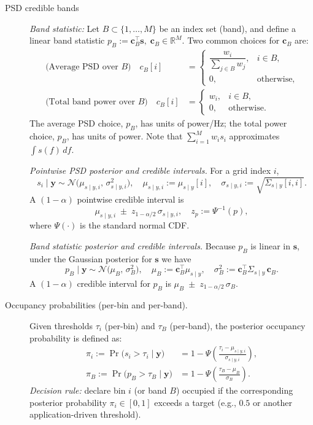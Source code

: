 \documentclass[11pt,a4paper]{report}
\theoremstyle{definition}
\providecommand{\ve}[1]{{\boldsymbol{#1}}}
\begin{document}
\begin{description}
\item[PSD credible bands]\;

\textit{Band statistic:} Let $B {\subset} \{1,\dots,M\}$ be an index set (band), and define a linear band statistic
\(p_B {:=} \ve{c}_B^\top \ve{s}, \; \ve{c}_B{ \in} \mathbb{R}^M.\) Two common choices for $\ve{c}_B$ are:
\begin{align*}
	\text{(Average PSD over $B$)}\quad
	c_B[i] &=
	\begin{cases}
		\dfrac{w_i}{\sum_{j \in B} w_j}, & i \in B,\\[6pt]
		0, & \text{otherwise,}
	\end{cases}
	\\[6pt]
	\text{(Total band power over $B$)}\quad
	c_B[i] &=
	\begin{cases}
		w_i, & i \in B,\\[4pt]
		0, & \text{otherwise.}
	\end{cases}
\end{align*}
The average PSD choice, $p_B$, has units of power/Hz; the total power choice, $p_B$, has units of power. Note that $\sum_{i=1}^M w_i s_i$ approximates $\int s(f)\,df$.

\textit{Pointwise PSD posterior and credible intervals.}
For a grid index $i$,
\[
s_i \mid \ve{y} \sim \mathcal{N}\!\big(\mu_{s\mid y,i},\, \sigma^2_{s\mid y,i}\big), 
\quad
\mu_{s\mid y,i} := \mu_{s\mid y}[i], 
\quad
\sigma_{s\mid y,i} := \sqrt{\varSigma_{s\mid y}[i,i]}.
\]
A $(1-\alpha)$ pointwise credible interval is
\[
\mu_{s\mid y,i} \;\pm\; z_{1-\alpha/2}\,\sigma_{s\mid y,i},
\quad
z_p := \Psi^{-1}(p),
\]
where $\Psi(\cdot)$ is the standard normal CDF.

\textit{Band statistic posterior and credible intervals.}
Because $p_B$ is linear in $\ve{s}$, under the Gaussian posterior for $\ve{s}$ we have
\[
p_B \mid \ve{y} \sim \mathcal{N}\!\big(\mu_B,\, \sigma_B^2\big),
\quad
\mu_B := \ve{c}_B^\top \mu_{s\mid y},
\quad
\sigma_B^2 := \ve{c}_B^\top \varSigma_{s\mid y}\, \ve{c}_B.
\]
A $(1-\alpha)$ credible interval for $p_B$ is
\(
\mu_B \;\pm\; z_{1-\alpha/2}\,\sigma_B.
\)

\item[{Occupancy probabilities (per-bin and per-band).}]
Given thresholds $\tau_i$ (per-bin) and $\tau_B$ (per-band), the posterior occupancy probability is defined as:
\begin{align*}
\pi_i :=	\Pr\!\big(s_i > \tau_i \mid \ve{y}\big) 
	&= 1 - \Psi\!\left(\frac{\tau_i - \mu_{s\mid y,i}}{\sigma_{s\mid y,i}}\right),\\[4pt]
\pi_B :=	\Pr\!\big(p_B > \tau_B \mid \ve{y}\big) 
	&= 1 - \Psi\!\left(\frac{\tau_B - \mu_B}{\sigma_B}\right).
\end{align*}
\textit{Decision rule:} declare bin $i$ (or band $B$) occupied if the corresponding posterior probability \(\pi_i {\in}[0,1]\) exceeds a target (e.g., $0.5$ or another application-driven threshold).


\end{description}
\end{document}

